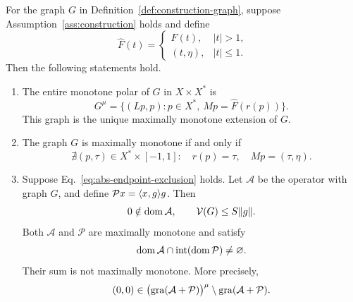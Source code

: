 \begin{theorem}
\label{thm:endpoint-criterion}
For the graph $G$ in Definition~\ref{def:construction-graph},
suppose Assumption~\ref{ass:construction} holds and define
\[
\widehat F(t)=
\begin{cases}
F(t),&|t|>1,\\
(t,\eta),&|t|\le1.
\end{cases}
\]
Then the following statements hold.
\begin{enumerate}
\renewcommand{\theenumi}{\roman{enumi}}
\renewcommand{\labelenumi}{(\theenumi)}
\item\label{thm:polar-part} The entire monotone polar of $G$ in $X\times X^*$ is
\begin{equation}
G^\mu=\{(Lp,p):p\in X^*,\ Mp=\widehat F(r(p))\}.
\label{eq:abs-entire-polar}
\end{equation}
This graph is the unique maximally monotone extension of $G$.

\item\label{thm:maximality-part} The graph $G$ is maximally monotone if and only if
\begin{equation}
\nexists(p,\tau)\in X^*\times[-1,1]:
\quad r(p)=\tau,\quad Mp=(\tau,\eta).
\label{eq:abs-endpoint-exclusion}
\end{equation}

\item\label{thm:sum-part} Suppose Eq.~\eqref{eq:abs-endpoint-exclusion} holds.
Let $\mathcal A$ be the operator with graph $G$, and define
$\mathcal P x=\langle x,g\rangle g$. Then
\[
0\notin\operatorname{dom}\mathcal A,\qquad \mathcal V(G)\le S\|g\|.
\]
Both $\mathcal A$ and $\mathcal P$ are maximally monotone and satisfy
\[
\operatorname{dom}\mathcal A\cap\operatorname{int}(\operatorname{dom}\mathcal P)\ne\varnothing.
\]
Their sum is not maximally monotone. More precisely,
\[
(0,0)\in
\bigl(\operatorname{gra}(\mathcal A+\mathcal P)\bigr)^\mu
\setminus\operatorname{gra}(\mathcal A+\mathcal P).
\]
\end{enumerate}
\end{theorem}
